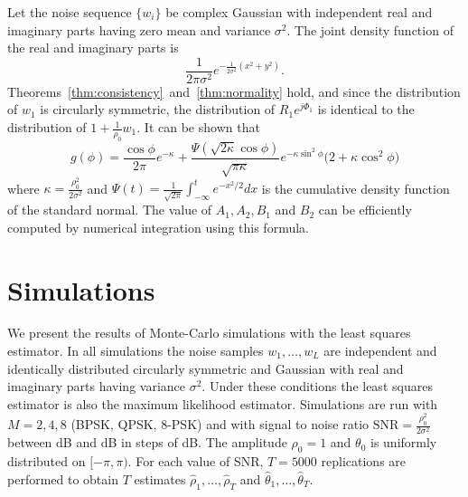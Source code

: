 \documentclass[draftcls, onecolumn, 11pt]{IEEEtran}
\begin{document}
Let the noise sequence $\{w_i\}$ be complex Gaussian with independent real and imaginary parts having zero mean and variance $\sigma^2$.  The joint density function of the real and imaginary parts is
\[
\frac{1}{2\pi\sigma^2}e^{-\frac{1}{2\sigma^2}(x^2 + y^2)}.
\]
Theorems~\ref{thm:consistency}~and~\ref{thm:normality} hold, and since the distribution of $w_1$ is circularly symmetric, the distribution of $R_1e^{j\Phi_1}$ is identical to the distribution of $1 + \frac{1}{\rho_0} w_1$.
It can be shown that
\[
g(\phi) = \frac{\cos\phi}{2\pi}e^{-\kappa} + \frac{\Psi(\sqrt{2\kappa} \cos\phi)}{\sqrt{\pi\kappa}}  e^{-\kappa\sin^2\phi} \big(2 + \kappa\cos^2\phi \big)
\]
where $\kappa = \tfrac{\rho_0^2}{2\sigma^2}$ and $\Psi(t) = \frac{1}{\sqrt{2\pi}} \int_{-\infty}^{t} e^{-x^2/2} dx$
is the cumulative density function of the standard normal.
The value of $A_1, A_2, B_1$ and $B_2$ can be efficiently computed by numerical integration using this formula.


\section{Simulations}\label{sec:simulations}

We present the results of Monte-Carlo simulations with the least squares estimator.  In all simulations the noise samples $w_1,\dots,w_L$ are independent and identically distributed circularly symmetric and Gaussian with real and imaginary parts having variance $\sigma^2$.  Under these conditions the least squares estimator is also the maximum likelihood estimator.  Simulations are run with $M=2,4,8$ (BPSK, QPSK, $8$-PSK) and with signal to noise ratio $\text{SNR} = \tfrac{\rho_0^2}{2\sigma^2}$ between \unit[-20]{dB} and \unit[20]{dB} in steps of \unit[1]{dB}.  The amplitude $\rho_0=1$ and $\theta_0$ is uniformly distributed on $[-\pi, \pi)$.  For each value of SNR, $T = 5000$ replications are performed to obtain $T$ estimates $\hat{\rho}_1, \dots, \hat{\rho}_T$ and $\hat{\theta}_1, \dots, \hat{\theta}_T$.  
\end{document}
